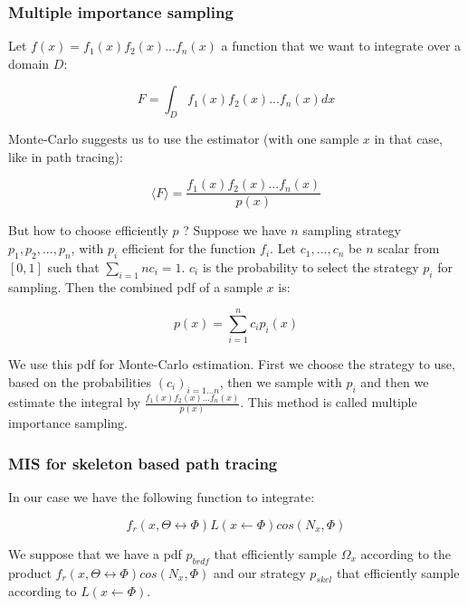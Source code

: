 \subsubsection{Multiple importance sampling}

Let $f(x) = f_1(x)f_2(x)...f_n(x)$ a function that we want to integrate over a domain $D$:

\begin{equation*}
F = \int_{D} f_1(x)f_2(x)...f_n(x) dx
\end{equation*}

Monte-Carlo suggests us to use the estimator (with one sample $x$ in that case, like in path tracing):

\begin{equation*}
\langle F \rangle = \frac{f_1(x)f_2(x)...f_n(x)}{p(x)}
\end{equation*}

But how to choose efficiently $p$ ? Suppose we have $n$ sampling strategy $p_1, p_2, ..., p_n$, with $p_i$ efficient for the function $f_i$. Let $c_1, ..., c_n$ be $n$ scalar from $[0,1]$ such that $\sum_{i = 1}{n} c_i = 1$. $c_i$ is the probability to select the strategy $p_i$ for sampling. Then the combined pdf of a sample $x$ is:

\begin{equation*}
p(x) = \sum_{i = 1}^{n} c_i p_i(x)
\end{equation*}

We use this pdf for Monte-Carlo estimation. First we choose the strategy to use, based on the probabilities $(c_i)_{i = 1...n}$, then we sample with $p_i$ and then we estimate the integral by $\frac{f_1(x)f_2(x)...f_n(x)}{p(x)}$. This method is called multiple importance sampling.

\subsubsection{MIS for skeleton based path tracing}

In our case we have the following function to integrate:

\begin{equation*}
f_r(x, \Theta \leftrightarrow \Phi) L(x \leftarrow \Phi) cos(N_x, \Phi)
\end{equation*}

We suppose that we have a pdf $p_{brdf}$ that efficiently sample $\Omega_x$ according to the product $f_r(x, \Theta \leftrightarrow \Phi) cos(N_x, \Phi)$ and our strategy $p_{skel}$ that efficiently sample according to $L(x \leftarrow \Phi)$.

